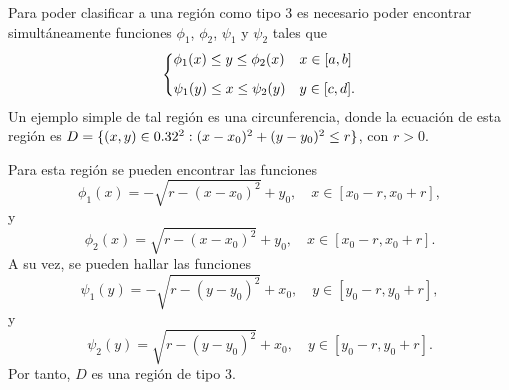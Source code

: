 \begin{example}
    Para poder clasificar a una regi\'on como tipo 3 es necesario poder encontrar simult\'aneamente funciones $\phi_1$, $\phi_2$, $\psi_1$ y $\psi_2$ tales que
    \[
    \begin{dcases}
        \phi_1(x)\leq y\leq\phi_2(x) & x\in[a,b]\\[.2cm]
        \psi_1(y)\leq x\leq\psi_2(y) & y\in[c,d].
    \end{dcases}
    \]
    Un ejemplo simple de tal regi\'on es una circunferencia, donde la ecuaci\'on de esta regi\'on es $D=\{(x,y)\in0.32^2:(x-x_0)^2+(y-y_0)^2\leq r\}$, con $r>0$.

    

    Para esta regi\'on se pueden encontrar las funciones
    \[
        \phi_1(x)=-\sqrt{r-(x-x_0)^2}+y_0,\quad x\in[x_0-r,x_0+r],
    \]
    y
    \[
        \phi_2(x)=\sqrt{r-(x-x_0)^2}+y_0,\quad x\in[x_0-r,x_0+r].
    \]
    A su vez, se pueden hallar las funciones
    \[
        \psi_1(y)=-\sqrt{r-(y-y_0)^2}+x_0,\quad y\in[y_0-r,y_0+r],
    \]
    y
    \[
        \psi_2(y)=\sqrt{r-(y-y_0)^2}+x_0,\quad y\in[y_0-r,y_0+r].
    \]
    Por tanto, $D$ es una regi\'on de tipo 3.
\end{example}

